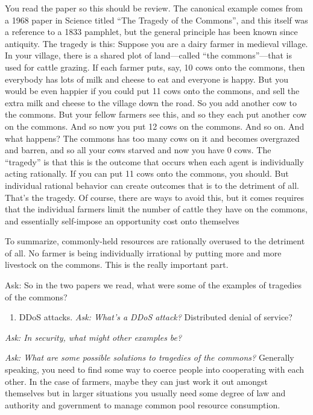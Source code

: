 \documentclass[11pt]{article}
\begin{document}
You read the paper so this should be review. The canonical example comes from a 1968 paper in Science titled “The Tragedy of the Commons”, and this itself was a reference to a 1833 pamphlet, but the general principle has been known since antiquity.
The tragedy is this: Suppose you are a dairy farmer in medieval village. In your village, there is a shared plot of land—called “the commons”---that is used for cattle grazing. If each farmer puts, say, 10 cows onto the commons, then everybody has lots of milk and cheese to eat and everyone is happy. But you would be even happier if you could put 11 cows onto the commons, and sell the extra milk and cheese to the village down the road. So you add another cow to the commons. But your fellow farmers see this, and so they each put another cow on the commons. And so now you put 12 cows on the commons. And so on. And what happens? The commons has too many cows on it and becomes overgrazed and barren, and so all your cows starved and now you have 0 cows.
The “tragedy” is that this is the outcome that occurs when each agent is individually acting rationally. If you can put 11 cows onto the commons, you should. But individual rational behavior can create outcomes that is to the detriment of all. That's the tragedy.
Of course, there are ways to avoid this, but it comes requires that the individual farmers limit the number of cattle they have on the commons, and essentially self-impose an opportunity cost onto themselves

To summarize, commonly-held resources are rationally overused to the detriment of all. No farmer is being individually irrational by putting more and more livestock on the commons. This is the really important part. 



{Ask: So in the two papers we read, what were some of the examples of tragedies of the commons?}
\begin{enumerate}
    \item DDoS attacks. {\it Ask: What's a DDoS attack?} Distributed denial of service?
\end{enumerate}

{\it Ask: In security, what might other examples be?}

{\it Ask: What are some possible solutions to tragedies of the commons?} Generally speaking, you need to find some way to coerce people into cooperating with each other. In the case of farmers, maybe they can just work it out amongst themselves but in larger situations you usually need some degree of law and authority and government to manage common pool resource consumption.
\end{document}
